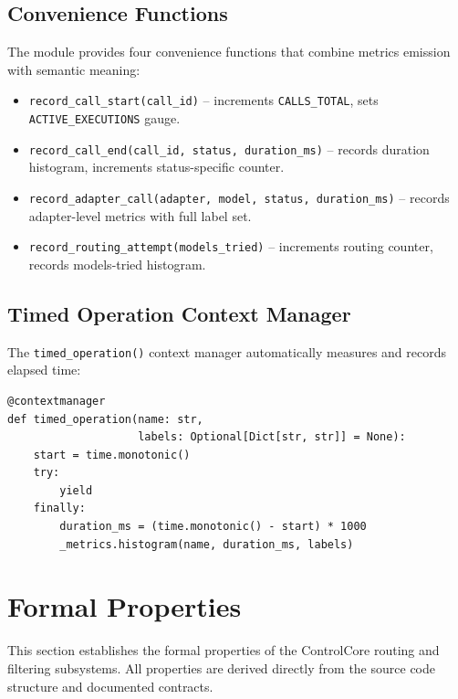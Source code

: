 \documentclass[11pt,a4paper]{article}
\theoremstyle{plain}
\theoremstyle{definition}
\begin{document}
\subsection{Convenience Functions}

The module provides four convenience functions that combine metrics emission
with semantic meaning:

\begin{itemize}[leftmargin=2em]
\item \texttt{record\_call\_start(call\_id)} -- increments
  \texttt{CALLS\_TOTAL}, sets \texttt{ACTIVE\_EXECUTIONS} gauge.
\item \texttt{record\_call\_end(call\_id, status, duration\_ms)} -- records
  duration histogram, increments status-specific counter.
\item \texttt{record\_adapter\_call(adapter, model, status, duration\_ms)} --
  records adapter-level metrics with full label set.
\item \texttt{record\_routing\_attempt(models\_tried)} -- increments routing
  counter, records models-tried histogram.
\end{itemize}

\subsection{Timed Operation Context Manager}

The \texttt{timed\_operation()} context manager automatically measures and
records elapsed time:

\begin{lstlisting}[style=pythonstyle, caption={timed\_operation from \texttt{observability.py}}]
@contextmanager
def timed_operation(name: str,
                    labels: Optional[Dict[str, str]] = None):
    start = time.monotonic()
    try:
        yield
    finally:
        duration_ms = (time.monotonic() - start) * 1000
        _metrics.histogram(name, duration_ms, labels)
\end{lstlisting}

\section{Formal Properties}
\label{sec:formal}

This section establishes the formal properties of the ControlCore routing and
filtering subsystems. All properties are derived directly from the source code
structure and documented contracts.
\end{document}
